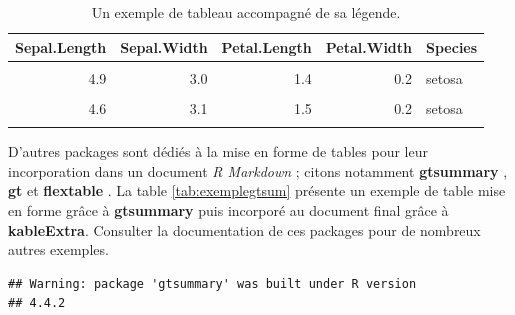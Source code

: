 \documentclass[french,]{compterendu}
\theoremstyle{urcastyle}
\theoremstyle{remark}
\begin{document}
\begin{table}
\centering
\caption{\label{tab:tableex}Un exemple de tableau accompagné de sa légende.}
\centering
\begin{tabular}[t]{rrrrl}
\toprule
\textbf{Sepal.Length} & \textbf{Sepal.Width} & \textbf{Petal.Length} & \textbf{Petal.Width} & \textbf{Species}\\
\midrule
\cellcolor{gray!10}{5.1} & \cellcolor{gray!10}{3.5} & \cellcolor{gray!10}{1.4} & \cellcolor{gray!10}{0.2} & \cellcolor{gray!10}{setosa}\\
4.9 & 3.0 & 1.4 & 0.2 & setosa\\
\cellcolor{gray!10}{4.7} & \cellcolor{gray!10}{3.2} & \cellcolor{gray!10}{1.3} & \cellcolor{gray!10}{0.2} & \cellcolor{gray!10}{setosa}\\
4.6 & 3.1 & 1.5 & 0.2 & setosa\\
\cellcolor{gray!10}{5.0} & \cellcolor{gray!10}{3.6} & \cellcolor{gray!10}{1.4} & \cellcolor{gray!10}{0.2} & \cellcolor{gray!10}{setosa}\\
\bottomrule
\end{tabular}
\end{table}

D'autres packages sont dédiés à la mise en forme de tables pour leur incorporation dans un document \emph{R Markdown} ; citons notamment \textbf{gtsummary} \autocite{pkggtsummary}, \textbf{gt} \autocite{pkggt} et \textbf{flextable} \autocite{pkgflextable}. La table \ref{tab:exemplegtsum} présente un exemple de table mise en forme grâce à \textbf{gtsummary} puis incorporé au document final grâce à \textbf{kableExtra}. Consulter la documentation de ces packages pour de nombreux autres exemples.

\begin{verbatim}
## Warning: package 'gtsummary' was built under R version
## 4.4.2
\end{verbatim}
\end{document}
